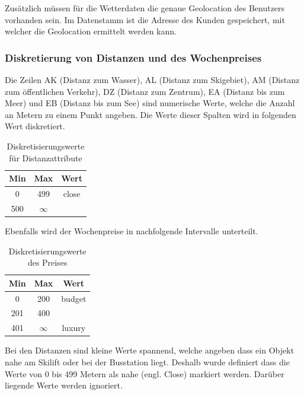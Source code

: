 Zusätzlich müssen für die Wetterdaten die genaue Geolocation des Benutzers vorhanden sein. Im Datenstamm ist die Adresse des Kunden gespeichert, mit welcher die Geolocation ermittelt werden kann.

\subsubsection{Diskretierung von Distanzen und des Wochenpreises} 
Die Zeilen AK (Distanz zum Wasser), AL (Distanz zum Skigebiet), AM (Distanz zum öffentlichen Verkehr), DZ (Distanz zum Zentrum), EA (Distanz bis zum Meer) und EB (Distanz bis zum See) sind numerische Werte, welche die Anzahl an Metern zu einem Punkt angeben. Die Werte dieser Spalten wird in folgenden Wert diskretiert. 

\begin{table}[h] 
	\caption{Diskretisierungswerte für Distanzattribute}
	\centering
	\label{fig:recherche:datenvorbereitung:1}
	\begin{tabular}{ | c | c | c | } 
		\hline 
		\rowcolor{tableheadcolor}
		\bfseries Min & \bfseries Max & \bfseries Wert \\ \hline 
		0 & 499 & close \\ \hline 
		500 & $\infty$ &   \\ \hline 
	\end{tabular}
\end{table}

Ebenfalls wird der Wochenpreise in nachfolgende Intervalle unterteilt.
\begin{table}[h] 
	\caption{Diskretisierungswerte des Preises}
	\centering
	\label{fig:recherche:datenvorbereitung:2}
	\begin{tabular}{ | c | c | c | } 
		\hline 
		\rowcolor{tableheadcolor}
		\bfseries Min & \bfseries Max & \bfseries Wert \\ \hline 
		0 & 200 & budget \\ \hline 
		201 & 400 &  \\ \hline 
		401 & $\infty$ & luxury \\ \hline 
	\end{tabular}
\end{table}

Bei den Distanzen sind kleine Werte spannend, welche angeben dass ein Objekt nahe am Skilift oder bei der Busstation liegt. Deshalb wurde definiert dass die Werte von 0 bis 499 Metern als nahe (engl. Close) markiert werden. Darüber liegende Werte werden ignoriert.

